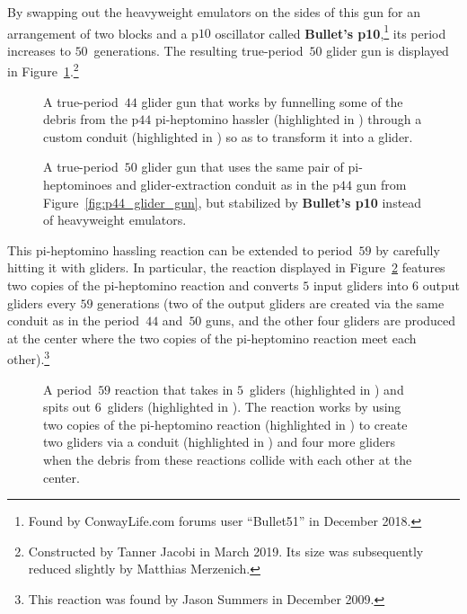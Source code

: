 By swapping out the heavyweight emulators on the sides of this gun for an arrangement of two blocks and a p$10$ oscillator called \textbf{Bullet's p10},\footnote{Found by ConwayLife.com forums user ``Bullet51'' in December 2018.} its period increases to $50$~generations. The resulting true-period~$50$ glider gun is displayed in Figure~\ref{fig:p50_true_gun}.\footnote{Constructed by Tanner Jacobi in March 2019. Its size was subsequently reduced slightly by Matthias Merzenich.}

\begin{figure}[!htb]
	\centering
	\begin{minipage}[t]{.48\textwidth}
		\centering
		\caption{A true-period~$44$ glider gun that works by funnelling some of the debris from the p$44$ pi-heptomino hassler (highlighted in ) through a custom conduit (highlighted in ) so as to transform it into a glider.}\label{fig:p44_glider_gun}
	\end{minipage} \hfill %
	\begin{minipage}[t]{.48\textwidth}
		\centering
		\caption{A true-period~$50$ glider gun that uses the same pair of pi-heptominoes and glider-extraction conduit as in the p$44$ gun from Figure~\ref{fig:p44_glider_gun}, but stabilized by \textbf{Bullet's p10} instead of heavyweight emulators.}\label{fig:p50_true_gun}
	\end{minipage}
\end{figure}

This pi-heptomino hassling reaction can be extended to period~$59$ by carefully hitting it with gliders. In particular, the reaction displayed in Figure~\ref{fig:p59_glider_reaction} features two copies of the pi-heptomino reaction and converts  $5$ input gliders into $6$ output gliders every $59$ generations (two of the output gliders are created via the same conduit as in the period~$44$ and~$50$ guns, and the other four gliders are produced at the center where the two copies of the pi-heptomino reaction meet each other).\footnote{This reaction was found by Jason Summers in December 2009.}

\begin{figure}[!b]
	\centering
	\caption{A period~$59$ reaction that takes in $5$~gliders (highlighted in ) and spits out $6$~gliders (highlighted in ). The reaction works by using two copies of the pi-heptomino reaction (highlighted in ) to create two gliders via a conduit (highlighted in ) and four more gliders when the debris from these reactions collide with each other at the center.}\label{fig:p59_glider_reaction}
\end{figure}


